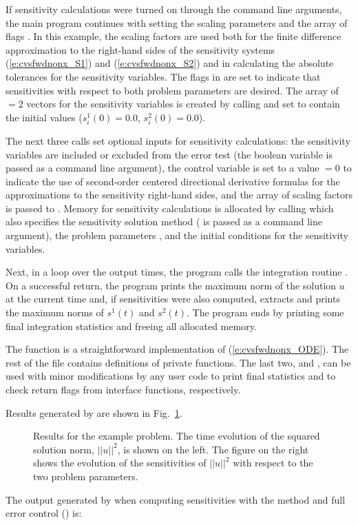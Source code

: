 If sensitivity calculations were turned on through the command line arguments,
the main program continues with setting the scaling parameters
 and the array of flags . In this example,
the scaling factors  are used both for the finite difference approximation
to the right-hand sides of the sensitivity systems (\ref{e:cvsfwdnonx_S1}) 
and (\ref{e:cvsfwdnonx_S2}) and in calculating the absolute tolerances for the 
sensitivity variables. 
The flags in  are set to indicate that sensitivities with respect to both 
problem parameters are desired.
The array of  $=2$ vectors  for the sensitivity variables is created
by calling  and set to contain the initial values
($s^1_i(0) = 0.0$, $s^2_i(0) = 0.0$).

The next three calls set optional inputs for sensitivity calculations: the sensitivity
variables are included or excluded from the error test (the boolean variable 
is passed as a command line argument), the control variable  is set to a value
 $=0$ to indicate  the use of second-order centered directional derivative formulas
for the approximations to the sensitivity right-hand sides, and the array of
scaling factors  is passed to {\cvodes}.
Memory for sensitivity calculations is allocated by calling 
which also specifies the sensitivity solution method ( is passed
as a command line argument), the problem parameters , and the initial conditions
for the sensitivity variables.

Next, in a loop over the  output times, the program calls the integration
routine . On a successful return, the program prints the maximum norm
of the solution $u$ at the current time and, if sensitivities were also computed, 
extracts and prints the maximum norms of $s^1(t)$ and $s^2(t)$.
The program ends by printing some final integration statistics and freeing all
allocated memory.

The  function is a straightforward implementation of (\ref{e:cvsfwdnonx_ODE}).
The rest of the file  contains definitions of private functions. 
The last two,  and , can be used with minor
modifications by any {\cvodes} user code to print final {\cvodes} statistics
and to check return flags from {\cvodes} interface functions, respectively.

Results generated by  are shown in Fig.~\ref{f:cvsfwdnonx}. 
\begin{figure}
  {\centerline{}}
  \caption{Results for the  example problem.
    The time evolution of the squared solution norm, $||u||^2$, is shown on the left. 
    The figure on the right shows the evolution of the sensitivities of $||u||^2$
    with respect to the two problem parameters.}
  \label{f:cvsfwdnonx}
\end{figure}
The output generated by  when computing sensitivities with the 
method and full error control () is:

